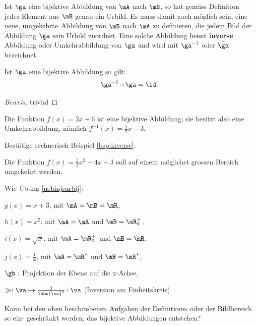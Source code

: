 \documentclass[%
11pt,%
twoside,%
titlepage,%
german,%
headsepline%
]{scrartcl}
\begin{document}
Ist $\ga$ eine bijektive Abbildung von $\mA$ nach $\mB$, so hat gemäss Definition jedes Element aus $\mB$ genau ein Urbild. Es muss damit auch möglich sein, eine neue, \glqq umgekehrte\grqq\ Abbildung von $\mB$ nach $\mA$ zu definieren, die jedem Bild der Abbildung $\ga$ sein Urbild zuordnet. Eine solche Abbildung heisst \textbf{inverse} Abbildung oder Umkehrabbildung von $\ga$ und wird mit $\ga^{-1}$ oder $\bar{\ga}$ bezeichnet.

\begin{satz}
Ist $\ga$ eine bijektive Abbildung so gilt:
$$\ga^{-1}\circ\ga=\id.$$
\end{satz}

\begin{proof}[Beweis]
trivial
\end{proof}

\begin{bsp}
\label{bsp:inverse}
Die Funktion $f(x) = 2x + 6$ ist eine bijektive Abbildung; sie besitzt also eine
Umkehrabbildung, nämlich $f^{-1}(x)=\frac{1}{2}x-3$.
\end{bsp}

\begin{ueb}
Bestätige rechnerisch Beispiel \ref{bsp:inverse}.
\end{ueb}

\begin{ueb}
Die Funktion $f(x) = \frac{1}{2}x^2-4x+3$ soll auf einem möglichst grossen Bereich umgekehrt werden.
\end{ueb}

\begin{ueb}
Wie Übung \ref{uebinjsurbij}:

\begin{enumeratea}
\addtocounter{enumi}{2}
\item $g(x)=x+3$, mit $\mA=\mB=\mR$,
\item $h(x)=x^2$, mit $\mA=\mR$ und $\mB=\mR^+_0$,
\item $i(x)=\sqrt{x}$, mit $\mA=\mR^+_0$ und $\mB=\mR$,
\item $j(x)=\frac{1}{x}$, mit $\mA=\mR^*$ und $\mB=\mR^*$,
\item $\gb:$ Projektion der Ebene auf die x-Achse,
\item $\gg:\va\mapsto\frac{1}{\abs{\va}^2}\cdot\va$ (Inversion am Einheitskreis)
\end{enumeratea}
\end{ueb}

\begin{ueb}
Kann bei den oben beschriebenen Aufgaben der Definitions- oder der Bildbereich so ein- geschränkt werden, das bijektive Abbildungen entstehen?
\end{ueb}
\end{document}
